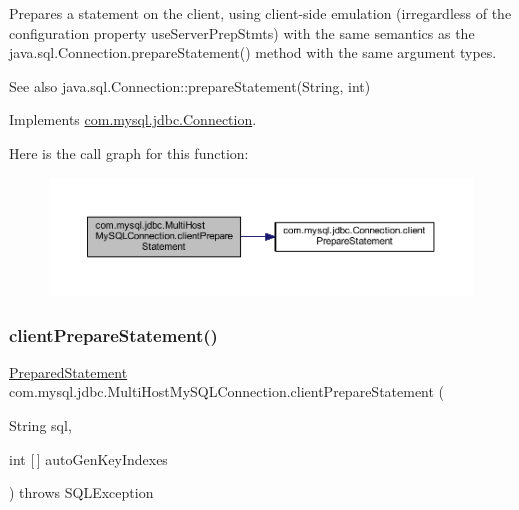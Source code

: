 Prepares a statement on the client, using client-\/side emulation (irregardless of the configuration property \textquotesingle{}use\+Server\+Prep\+Stmts\textquotesingle{}) with the same semantics as the java.\+sql.\+Connection.\+prepare\+Statement() method with the same argument types.

\begin{DoxySeeAlso}{See also}
java.\+sql.\+Connection\+::prepare\+Statement(\+String, int) 
\end{DoxySeeAlso}


Implements \mbox{\hyperlink{interfacecom_1_1mysql_1_1jdbc_1_1_connection_a4942503d586cb18634b960ee276fa1bb}{com.\+mysql.\+jdbc.\+Connection}}.

Here is the call graph for this function\+:
\nopagebreak
\begin{figure}[H]
\begin{center}
\leavevmode
\includegraphics[width=350pt]{classcom_1_1mysql_1_1jdbc_1_1_multi_host_my_s_q_l_connection_a71d9841bc1d2d9d49980fb98d780c84c_cgraph}
\end{center}
\end{figure}
\mbox{\label{classcom_1_1mysql_1_1jdbc_1_1_multi_host_my_s_q_l_connection_a943b6c7d2931f82f72806b47271f259c}} 
\subsubsection{\texorpdfstring{client\+Prepare\+Statement()}{clientPrepareStatement()}\hspace{0.1cm}{\footnotesize\ttfamily [4/6]}}
{\footnotesize\ttfamily \mbox{\hyperlink{classcom_1_1mysql_1_1jdbc_1_1_prepared_statement}{Prepared\+Statement}} com.\+mysql.\+jdbc.\+Multi\+Host\+My\+S\+Q\+L\+Connection.\+client\+Prepare\+Statement (\begin{DoxyParamCaption}\item[{String}]{sql,  }\item[{int \mbox{[}$\,$\mbox{]}}]{auto\+Gen\+Key\+Indexes }\end{DoxyParamCaption}) throws S\+Q\+L\+Exception}

